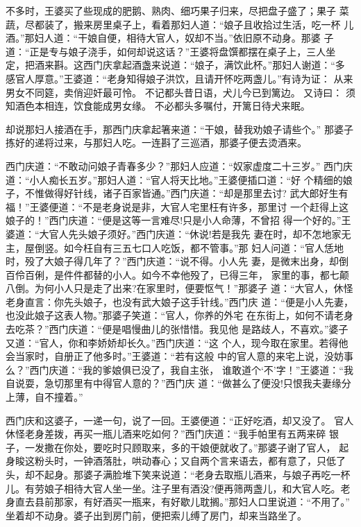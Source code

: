 不多时，王婆买了些现成的肥鹅、熟肉、细巧果子归来，尽把盘子盛了；果子
菜蔬，尽都装了，搬来房里桌子上，看着那妇人道：“娘子且收拾过生活，吃一杯
儿酒。”那妇人道：“干娘自便，相待大官人，奴却不当。”依旧原不动身。那婆
子道：“正是专与娘子浇手，如何却说这话？”王婆将盘馔都摆在桌子上，三人坐
定，把酒来斟。这西门庆拿起酒盏来说道：“娘子，满饮此杯。”那妇人谢道：“多
感官人厚意。”王婆道：“老身知得娘子洪饮，且请开怀吃两盏儿。”有诗为证：
从来男女不同筵，卖俏迎奸最可怜。
不记都头昔日语，犬儿今已到篱边。
又诗曰：
须知酒色本相连，饮食能成男女缘。
不必都头多嘱付，开篱日待犬来眠。

却说那妇人接酒在手，那西门庆拿起箸来道：“干娘，替我劝娘子请些个。”
那婆子拣好的递将过来，与那妇人吃。一连斟了三巡酒，那婆子便去烫酒来。

西门庆道：“不敢动问娘子青春多少？”那妇人应道：“奴家虚度二十三岁。”
西门庆道：“小人痴长五岁。”那妇人道：“官人将天比地。”王婆便插口道：“好
个精细的娘子，不惟做得好针线，诸子百家皆通。”西门庆道：“却是那里去讨?
武大郎好生有福！”王婆便道：“不是老身说是非，大官人宅里枉有许多，那里讨
一个赶得上这娘子的！”西门庆道：“便是这等一言难尽!只是小人命薄，不曾招
得一个好的。”王婆道：“大官人先头娘子须好。”西门庆道：“休说!若是我先
妻在时，却不怎地家无主，屋倒竖。如今枉自有三五七口人吃饭，都不管事。”那
妇人问道：“官人恁地时，殁了大娘子得几年了？”西门庆道：“说不得。小人先
妻，是微末出身，却倒百伶百俐，是件件都替的小人。如今不幸他殁了，已得三年，
家里的事，都七颠八倒。为何小人只是走了出来?在家里时，便要怄气！”那婆子
道：“大官人，休怪老身直言：你先头娘子，也没有武大娘子这手针线。”西门庆
道：“便是小人先妻，也没此娘子这表人物。”那婆子笑道：“官人，你养的外宅
在东街上，如何不请老身去吃茶？”西门庆道：“便是唱慢曲儿的张惜惜。我见他
是路歧人，不喜欢。”婆子又道：“官人，你和李娇娇却长久。”西门庆道：“这
个人，现今取在家里。若得他会当家时，自册正了他多时。”王婆道：“若有这般
中的官人意的来宅上说，没妨事么？”西门庆道：“我的爹娘俱已没了，我自主张，
谁敢道个‘不’字！”王婆道：“我自说耍，急切那里有中得官人意的？”西门庆
道：“做甚么了便没!只恨我夫妻缘分上薄，自不撞着。”

西门庆和这婆子，一递一句，说了一回。王婆便道：“正好吃酒，却又没了。
官人休怪老身差拨，再买一瓶儿酒来吃如何？”西门庆道：“我手帕里有五两来碎
银子，一发撒在你处，要吃时只顾取来，多的干娘便就收了。”那婆子谢了官人，
起身睃这粉头时，一钟酒落肚，哄动春心；又自两个言来语去，都有意了，只低了
头，却不起身。那婆子满脸堆下笑来说道：“老身去取瓶儿酒来，与娘子再吃一杯
儿。有劳娘子相待大官人坐一坐。注子里有酒没?便再筛两盏儿，和大官人吃。老
身直去县前那家，有好酒买一瓶来，有好歇儿耽搁。”那妇人口里说道：“不用了。”
坐着却不动身。婆子出到房门前，便把索儿缚了房门，却来当路坐了。

